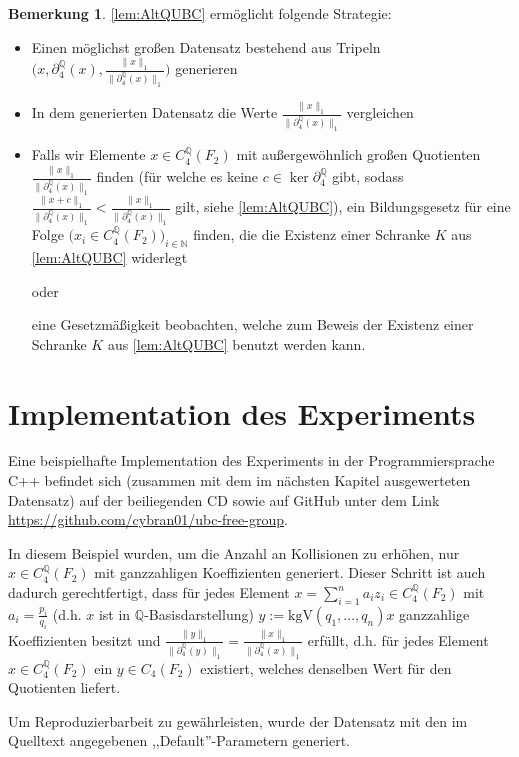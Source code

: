\documentclass[a4paper,twoside,10pt]{scrreprt}
\newcommand{\N}{\mathbb{N}}
\newcommand{\Q}{\mathbb{Q}}
\theoremstyle{definition}
\newtheorem{bemerkung}[satz]{Bemerkung}
\begin{document}
\begin{bemerkung}\label{bem:strategy}
\cref{lem:AltQUBC} ermöglicht folgende Strategie: 
\begin{itemize}
\item Einen möglichst großen Datensatz bestehend aus Tripeln $\biggl(x,\partial_4^{\Q}(x),\frac{\|x\|_1}{\|\partial_4^{\Q}(x)\|_1}\biggr)$ generieren
\item In dem generierten Datensatz die Werte $\frac{\|x\|_1}{\|\partial_4^{\Q}(x)\|_1}$ vergleichen
\item Falls wir Elemente $x\in C_4^{\Q}(F_2)$ mit außergewöhnlich großen Quotienten $\frac{\|x\|_1}{\|\partial_4^{\Q}(x)\|_1}$ finden (für welche es keine $c\in \ker\partial_4^{\Q}$ gibt, sodass $\frac{\|x+c\|_1}{\|\partial_4^{\Q}(x)\|_1}<\frac{\|x\|_1}{\|\partial_4^{\Q}(x)\|_1}$ gilt, siehe \cref{lem:AltQUBC}), ein Bildungsgesetz für eine Folge $\bigl(x_i\in C_4^{\Q}(F_2)\bigr)_{i\in\N}$ finden, die die Existenz einer Schranke $K$ aus \cref{lem:AltQUBC} widerlegt \par oder \par eine Gesetzmäßigkeit beobachten, welche zum Beweis der Existenz einer Schranke $K$ aus \cref{lem:AltQUBC} benutzt werden kann.
\end{itemize}
\end{bemerkung}
\section{Implementation des Experiments}
Eine beispielhafte Implementation des Experiments in der Programmiersprache C++ befindet sich (zusammen mit dem im nächsten Kapitel ausgewerteten Datensatz) auf der beiliegenden CD sowie auf GitHub unter dem Link \url{https://github.com/cybran01/ubc-free-group}.
\par
In diesem Beispiel wurden, um die Anzahl an Kollisionen zu erhöhen, nur $x\in C_4^{\Q}(F_2)$ mit ganzzahligen Koeffizienten generiert. Dieser Schritt ist auch dadurch gerechtfertigt, dass für jedes Element $x=\sum\limits_{i=1}^na_iz_i\in C_4^{\Q}(F_2)$ mit $a_i=\frac{p_i}{q_i}$ (d.h. $x$ ist in $\Q$-Basisdarstellung) $y:=\text{kgV}(q_1,\ldots,q_n)x$ ganzzahlige Koeffizienten besitzt und $\frac{\|y\|_1}{\|\partial_4^{\Q}(y)\|_1}=\frac{\|x\|_1}{\|\partial_4^{\Q}(x)\|_1}$ erfüllt, d.h. für jedes Element $x\in C_4^{\Q}(F_2)$ ein $y\in C_4(F_2)$ existiert, welches denselben Wert für den Quotienten liefert.\par 
Um Reproduzierbarbeit zu gewährleisten, wurde der Datensatz mit den im Quelltext angegebenen ,,Default''-Parametern generiert.
\end{document}
